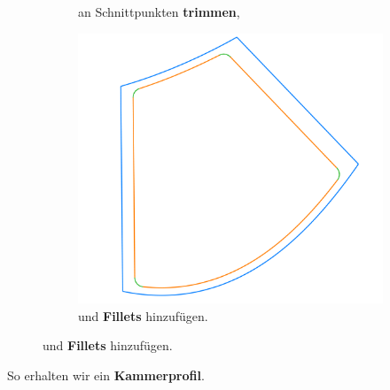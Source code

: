 \documentclass[8pt, aspectratio=169]{beamer}
\begin{document}
\begin{frame}
\begin{minipage}[t]{\textwidth}
\begin{figure}[H]
\begin{subfigure}{.32\textwidth}
				\caption{an Schnittpunkten \textbf{trimmen},}
			\end{subfigure}
			\begin{subfigure}{.32\textwidth}
				\includegraphics[width=\textwidth]{../../tec/chambers/83.png}
				\caption{und \textbf{Fillets} hinzufügen.}
			\end{subfigure}
			\label{fig:chamber_shrinking}
		\end{figure}
		So erhalten wir ein \textbf{Kammerprofil}.
	\end{minipage}
	\vfill
\end{frame}
\end{document}
